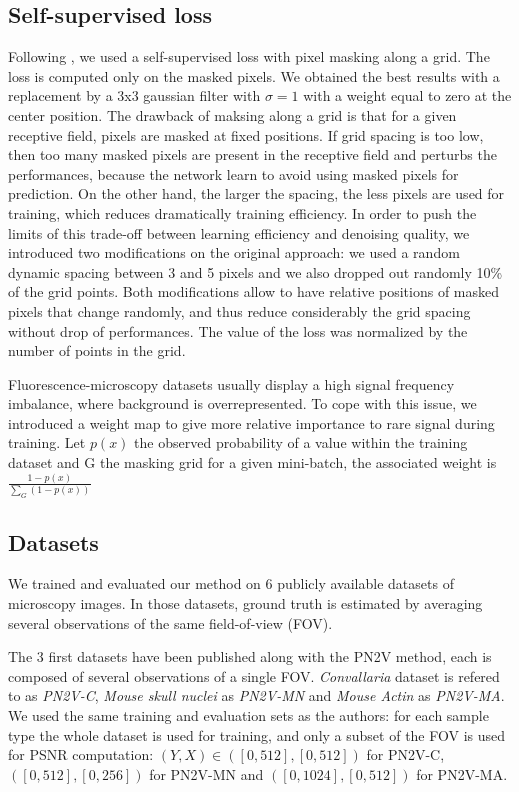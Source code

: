 \documentclass{article}
\begin{document}
\subsection{Self-supervised loss}
Following \cite{batson2019noise2self}, we used a self-supervised loss with pixel masking along a grid. The loss is computed only on the masked pixels.
We obtained the best results with a replacement by a 3x3 gaussian filter with $\sigma=1$ with a weight equal to zero at the center position.
The drawback of maksing along a grid is that for a given receptive field, pixels are masked at fixed positions. If grid spacing is too low, then too many masked pixels are present in the receptive field and perturbs the performances, because the network learn to avoid using masked pixels for prediction. On the other hand, the larger the spacing, the less pixels are used for training, which reduces dramatically training efficiency.
In order to push the limits of this trade-off between learning efficiency and denoising quality, we introduced two modifications on the original approach: we used a random dynamic spacing between 3 and 5 pixels and we also dropped out randomly 10\% of the grid points. Both modifications allow to have relative positions of masked pixels that change randomly, and thus reduce considerably the grid spacing without drop of performances. The value of the loss was normalized by the number of points in the grid.

Fluorescence-microscopy datasets usually display a high signal frequency imbalance, where background is overrepresented. To cope with this issue, we introduced a weight map to give more relative importance to rare signal during training. Let $p(x)$ the observed probability of a value within the training dataset and G the masking grid for a given mini-batch, the associated weight is $\frac{1 - p(x)}{\sum_{G}(1 - p(x))}$

\subsection{Datasets}
We trained and evaluated our method on 6 publicly available datasets of microscopy images. In those datasets, ground truth is estimated by averaging several observations of the same field-of-view (FOV).

The 3 first datasets have been published along with the PN2V method\cite{krull2019probabilistic}, each is composed of several observations of a single FOV. \emph{Convallaria} dataset is refered to as \emph{PN2V-C}, \emph{Mouse skull nuclei} as \emph{PN2V-MN} and \emph{Mouse Actin} as \emph{PN2V-MA}. We used the same training and evaluation sets as the authors: for each sample type the whole dataset is used for training, and only a subset of the FOV is used for PSNR computation: $(Y,X)\in([0, 512], [0, 512])$ for PN2V-C, $([0, 512], [0, 256])$ for PN2V-MN and $([0, 1024], [0, 512])$ for PN2V-MA.
\end{document}
